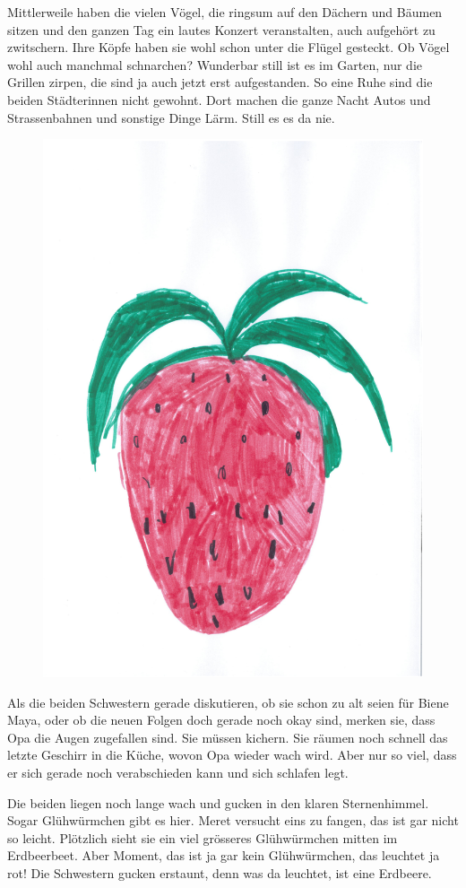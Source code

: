 Mittlerweile haben die vielen Vögel, die ringsum auf den Dächern und Bäumen sitzen und den ganzen Tag ein lautes Konzert veranstalten, auch aufgehört zu zwitschern. Ihre Köpfe haben sie wohl schon unter die Flügel gesteckt. Ob Vögel wohl auch manchmal schnarchen? Wunderbar still ist es im Garten, nur die Grillen zirpen, die sind ja auch jetzt erst aufgestanden.  So eine Ruhe sind die beiden Städterinnen nicht gewohnt. Dort machen die ganze Nacht Autos und Strassenbahnen und sonstige Dinge Lärm. Still es es da nie. 

\begin{figure}[!htb]
\centering
\includegraphics[width=.65\textwidth]{bilder/opa1.pdf}
\end{figure}

Als die beiden Schwestern gerade diskutieren, ob sie schon zu alt seien für Biene Maya, oder ob die neuen Folgen doch gerade noch okay sind, merken sie, dass Opa die Augen zugefallen sind. Sie müssen kichern. Sie räumen noch schnell das letzte Geschirr in die Küche, wovon Opa wieder wach wird. Aber nur so viel, dass er sich gerade noch verabschieden kann und sich schlafen legt.


Die beiden liegen noch lange wach und gucken in den klaren Sternenhimmel. Sogar Glühwürmchen gibt es hier. Meret versucht eins zu fangen, das ist gar nicht so leicht. Plötzlich sieht sie ein viel grösseres Glühwürmchen mitten im Erdbeerbeet. Aber Moment, das ist ja gar kein Glühwürmchen, das leuchtet ja rot! Die Schwestern gucken erstaunt, denn was da leuchtet, ist eine Erdbeere.

